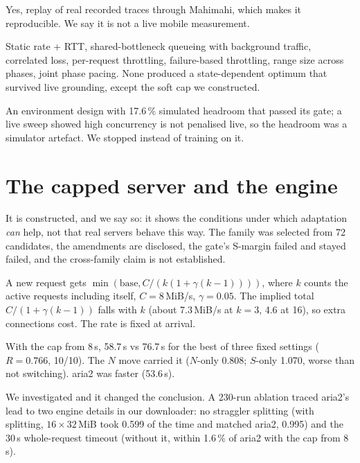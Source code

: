 \A Yes, replay of real recorded traces through Mahimahi, which makes it reproducible. We say it is not a live mobile measurement.

\A Static rate + RTT, shared-bottleneck queueing with background traffic, correlated loss, per-request throttling, failure-based throttling, range size across phases, joint phase pacing. None produced a state-dependent optimum that survived live grounding, except the soft cap we constructed.

\A An environment design with 17.6\,\% simulated headroom that passed its gate; a live sweep showed high concurrency is not penalised live, so the headroom was a simulator artefact. We stopped instead of training on it.

\section{The capped server and the engine}
\A It is constructed, and we say so: it shows the conditions under which adaptation \emph{can} help, not that real servers behave this way. The family was selected from 72 candidates, the amendments are disclosed, the gate's S-margin failed and stayed failed, and the cross-family claim is not established.

\A A new request gets $\min(\text{base}, C/(k(1+\gamma(k-1))))$, where $k$ counts the active requests including itself, $C=8$\,MiB/s, $\gamma=0.05$. The implied total $C/(1+\gamma(k-1))$ falls with $k$ (about 7.3\,MiB/s at $k=3$, 4.6 at 16), so extra connections cost. The rate is fixed at arrival.

\A With the cap from 8\,s, 58.7\,s vs 76.7\,s for the best of three fixed settings ($R=0.766$, 10/10). The $N$ move carried it ($N$-only 0.808; $S$-only 1.070, worse than not switching). aria2 was faster (53.6\,s).

\A We investigated and it changed the conclusion. A 230-run ablation traced aria2's lead to two engine details in our downloader: no straggler splitting (with splitting, $16\times32$\,MiB took 0.599 of the time and matched aria2, 0.995) and the 30\,s whole-request timeout (without it, within 1.6\,\% of aria2 with the cap from 8\,s).

